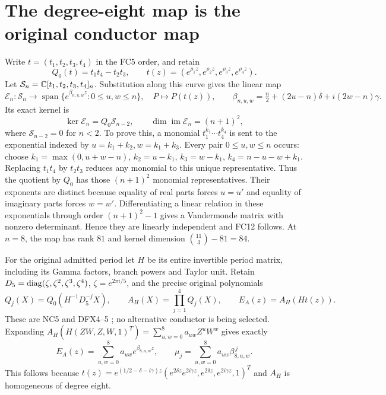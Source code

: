 \section{The degree-eight map is the original conductor map}
Write $t=(t_1,t_2,t_3,t_4)$ in the FC5 order, and retain
\[
 Q_0(t)=t_1t_4-t_2t_3,\qquad
 t(z)=(e^{\rho_1z},e^{\rho_2z},e^{\rho_3z},e^{\rho_4z}).
 \tag{FC10}
\]
Let $\mathcal S_n=\mathbb C[t_1,t_2,t_3,t_4]_n$. Substitution along this
curve gives the linear map
\[
 \mathcal E_n:\mathcal S_n\to
 \operatorname{span}\{e^{\beta_{n,u,w}z}:0\le u,w\le n\},
 \quad P\mapsto P(t(z)),\qquad
 \beta_{n,u,w}=\tfrac n2+(2u-n)\delta+i(2w-n)\gamma.
 \tag{FC11}
\]
Its exact kernel is
\[
 \ker\mathcal E_n=Q_0\mathcal S_{n-2},\qquad
 \dim\operatorname{im}\mathcal E_n=(n+1)^2,
 \tag{FC12}
\]
where $\mathcal S_{n-2}=0$ for $n<2$.
To prove this, a monomial $t_1^{k_1}\cdots t_4^{k_4}$ is sent to the
exponential indexed by $u=k_1+k_2,w=k_1+k_3$. Every pair $0\le u,w\le n$
occurs: choose
$k_1=\max(0,u+w-n)$, $k_2=u-k_1$, $k_3=w-k_1$,
$k_4=n-u-w+k_1$. Replacing $t_1t_4$ by $t_2t_3$ reduces any monomial to
this unique representative. Thus the quotient by $Q_0$ has those
$(n+1)^2$ monomial representatives. Their exponents are distinct because
equality of real parts forces $u=u'$ and equality of imaginary parts
forces $w=w'$. Differentiating a linear relation in these exponentials
through order $(n+1)^2-1$ gives a Vandermonde matrix with nonzero
determinant. Hence they are linearly independent and FC12 follows.
At $n=8$, the map has rank $81$ and kernel dimension
$\binom{11}{3}-81=84$.

For the original admitted period let $H$ be its entire invertible period
matrix, including its Gamma factors, branch powers and Taylor unit.
Retain $D_5=\operatorname{diag}(\zeta,\zeta^2,\zeta^3,\zeta^4)$,
$\zeta=e^{2\pi i/5}$, and the precise original polynomials
\[
 Q_j(X)=Q_0(H^{-1}D_5^{-j}X),\qquad
 A_H(X)=\prod_{j=1}^4Q_j(X),\qquad
 E_A(z)=A_H(Ht(z)).
 \tag{FC13}
\]
These are NC5 and DFX4--5 \cite{fullfable:NC,fullfable:Cumulative}; no alternative conductor
is being selected. Expanding
$A_H(H(ZW,Z,W,1)^T)=\sum_{u,w=0}^8 a_{uw}Z^uW^w$ gives exactly
\[
 E_A(z)=\sum_{u,w=0}^8a_{uw}e^{\beta_{8,u,w}z},\qquad
 \mu_j=\sum_{u,w=0}^8a_{uw}\beta_{8,u,w}^{\,j}.
 \tag{FC14}
\]
This follows because
$t(z)=e^{(1/2-\delta-i\gamma)z}
(e^{2\delta z}e^{2i\gamma z},e^{2\delta z},e^{2i\gamma z},1)^T$
and $A_H$ is homogeneous of degree eight.

